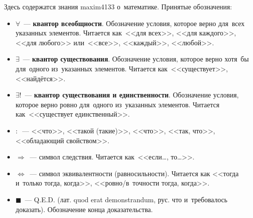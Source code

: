 Здесь содержатся знания maxim4133 о~математике. Принятые обозначения:
\begin{itemize}
	\item $\forall$~--- \textbf{квантор всеобщности}.
	Обозначение условия, которое верно для~всех указанных элементов.
	Читается как~<<для всех>>, <<для каждого>>, <<для любого>> или~<<все>>, <<каждый>>, <<любой>>.
	\item $\exists$~--- \textbf{квантор существования}.
	Обозначение условия, которое верно хотя~бы для~одного из~указанных элементов.
	Читается как~<<существует>>, <<найдётся>>.
	\item $\exists!$~--- \textbf{квантор существования и единственности}.
	Обозначение условия, которое верно ровно для~одного из~указанных элементов.
	Читается как~<<существует единственный>>.
	\item $\colon$~--- <<что>>, <<такой (такие)>>, <<что>>, <<так, что>>, <<обладающий свойством>>.
	\item $\Rightarrow$~--- символ следствия.
	Читается как~<<если\dots, то\dots>>.
	\item $\Leftrightarrow$~--- символ эквивалентности (равносильности).
	Читается как <<тогда и~только тогда, когда>>, <<ровно/в~точности тогда, когда>>.
	\item $\scriptstyle \blacksquare$~--- Q.E.D. (лат. quod erat demonstrandum, рус. что и~требовалось доказать).
	Обозначение конца доказательства.
\end{itemize}